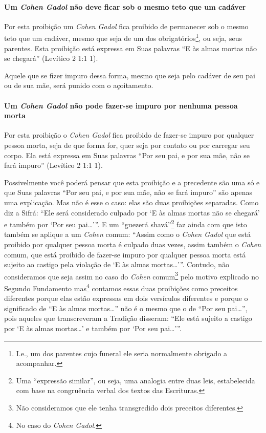 \paragraph{Um \textit{Cohen Gadol} não deve ficar sob o mesmo teto que um cadáver}

Por esta proibição um \textit{Cohen Gadol} fica proibido de permanecer sob o
mesmo teto que um cadáver, mesmo que seja de um dos
obrigatórios\footnote{I.e., um dos parentes cujo funeral ele seria normalmente obrigado a acompanhar.}, ou seja, seus parentes. Esta
proibição está expressa em Suas palavras ``E às almas mortas não se
chegará'' (Levítico 2 1:1 1).

Aquele que se fizer impuro dessa forma, mesmo que seja pelo cadáver de
seu pai ou de sua mãe, será punido com o açoitamento.

\paragraph{Um \textit{Cohen Gadol} não pode fazer-se impuro por nenhuma pessoa morta}

Por esta proibição o \textit{Cohen Gadol} fica proibido de fazer-se impuro
por qualquer pessoa morta, seja de que forma for, quer seja por contato
ou por carregar seu corpo. Ela está expressa em Suas palavras ``Por seu
pai, e por sua mãe, não se fará impuro'' (Levítico 2 1:1 1).

Possivelmente você poderá pensar que esta proibição e a precedente são
uma só e que Suas palavras ``Por seu pai, e por sua mãe, não se fará
impuro'' são apenas uma explicação. Mas não é esse o caso: elas são
duas proibições separadas. Como diz a Sifrá: ``Ele será considerado
culpado por `E às almas mortas não se chegará' e também por `Por seu
pai\ldots{}'''. E um ``guezerá shavá''\footnote{Uma ``expressão similar'', ou seja, uma analogia entre duas leis,
  estabelecida com base na congruência verbal dos textos das
  Escrituras.} faz ainda com
que isto também se aplique a um \textit{Cohen} comum: ``Assim como o \textit{Cohen
Gadol} que está proibido por qualquer pessoa morta é culpado duas vezes,
assim também o \textit{Cohen} comum, que está proibido de fazer-se impuro por
qualquer pessoa morta está sujeito ao castigo pela violação de `E às
almas mortas\ldots{}'''. Contudo, não consideramos que seja assim no caso do
\textit{Cohen} comum\footnote{Não consideramos que ele tenha transgredido dois preceitos
  diferentes.} pelo motivo explicado no Segundo
Fundamento mas\footnote{No caso do \textit{Cohen Gadol}.} contamos essas duas proibições
como preceitos diferentes porque elas estão expressas em dois
versículos diferentes e porque o significado de ``E às almas
mortas\ldots{}'' não é o mesmo que o de ``Por seu pai\ldots{}'', pois aqueles que
transcreveram a Tradição disseram: ``Ele está sujeito a castigo por `E
às almas mortas\ldots{}' e também por `Por seu pai\ldots{}'''.

